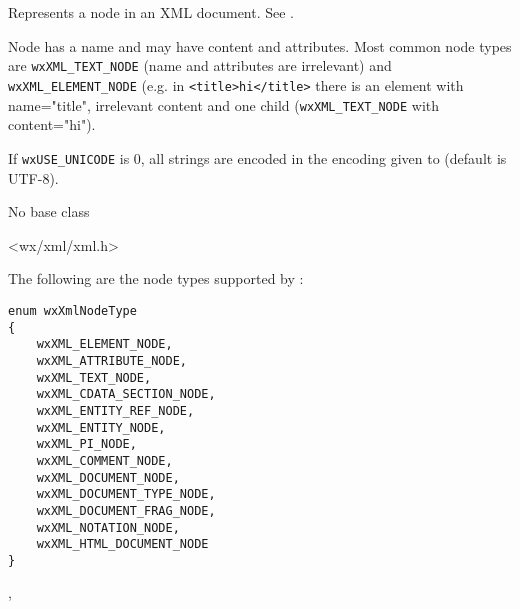 
\section{}\label{wxxmlnode}

Represents a node in an XML document. See .

Node has a name and may have content and attributes. Most common node types are 
{\tt wxXML\_TEXT\_NODE} (name and attributes are irrelevant) and 
{\tt wxXML\_ELEMENT\_NODE} (e.g. in {\tt <title>hi</title>} there is an element
with name="title", irrelevant content and one child ({\tt wxXML\_TEXT\_NODE}
with content="hi").

If \texttt{wxUSE\_UNICODE} is 0, all strings are encoded in the encoding given to
 (default is UTF-8).



No base class


<wx/xml/xml.h>


The following are the node types supported by :

{\small
\begin{verbatim}
enum wxXmlNodeType
{
    wxXML_ELEMENT_NODE,
    wxXML_ATTRIBUTE_NODE,
    wxXML_TEXT_NODE,
    wxXML_CDATA_SECTION_NODE,
    wxXML_ENTITY_REF_NODE,
    wxXML_ENTITY_NODE,
    wxXML_PI_NODE,
    wxXML_COMMENT_NODE,
    wxXML_DOCUMENT_NODE,
    wxXML_DOCUMENT_TYPE_NODE,
    wxXML_DOCUMENT_FRAG_NODE,
    wxXML_NOTATION_NODE,
    wxXML_HTML_DOCUMENT_NODE
}
\end{verbatim}
}


, 




\label{wxxmlnodewxxmlnode}

